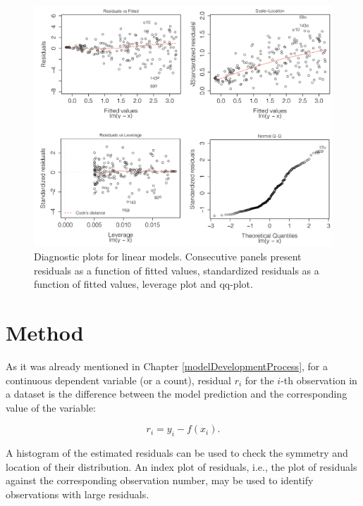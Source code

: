 \documentclass[]{krantz}
\begin{document}
\begin{figure}

{\centering \includegraphics[width=1\linewidth]{figure/residuals1234} 

}

\caption{Diagnostic plots for linear models. Consecutive panels present residuals as a function of fitted values, standardized residuals as a function of fitted values, leverage plot and qq-plot.}\label{fig:residuals1234}
\end{figure}

\hypertarget{MethodResidualDiagnostic}{%
\section{Method}\label{MethodResidualDiagnostic}}

As it was already mentioned in Chapter \ref{modelDevelopmentProcess}, for a continuous dependent variable (or a count), residual \(r_i\) for the \(i\)-th observation in a dataset is the difference between the model prediction and the corresponding value of the variable:

\begin{equation}
r_i = y_i - f(x_i).
\label{eq:resid}
\end{equation}

A histogram of the estimated residuals can be used to check the symmetry and location of their distribution. An index plot of residuals, i.e., the plot of residuals against the corresponding observation number, may be used to identify observations with large residuals.
\end{document}
